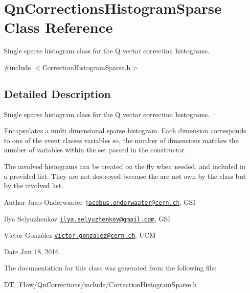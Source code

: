 \hypertarget{classQnCorrectionsHistogramSparse}{}\section{Qn\+Corrections\+Histogram\+Sparse Class Reference}
\label{classQnCorrectionsHistogramSparse}


Single sparse histogram class for the Q vector correction histograms.  




{\ttfamily \#include $<$Correction\+Histogram\+Sparse.\+h$>$}



\subsection{Detailed Description}
Single sparse histogram class for the Q vector correction histograms. 

Encapsulates a multi dimensional sparse histogram. Each dimension corresponds to one of the event classes variables so, the number of dimensions matches the number of variables within the set passed in the constructor.

The involved histograms can be created on the fly when needed, and included in a provided list. They are not destroyed because the are not own by the class but by the involved list.

\begin{DoxyAuthor}{Author}
Jaap Onderwaater \href{mailto:jacobus.onderwaater@cern.ch}{\tt jacobus.\+onderwaater@cern.\+ch}, G\+SI 

Ilya Selyuzhenkov \href{mailto:ilya.selyuzhenkov@gmail.com}{\tt ilya.\+selyuzhenkov@gmail.\+com}, G\+SI 

Víctor González \href{mailto:victor.gonzalez@cern.ch}{\tt victor.\+gonzalez@cern.\+ch}, U\+CM 
\end{DoxyAuthor}
\begin{DoxyDate}{Date}
Jun 18, 2016 
\end{DoxyDate}


The documentation for this class was generated from the following file\+:\begin{DoxyCompactItemize}
\item 
D\+T\+\_\+\+Flow/\+Qn\+Corrections/include/Correction\+Histogram\+Sparse.\+h\end{DoxyCompactItemize}
